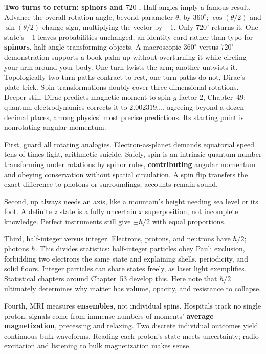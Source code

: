 \begin{challenge}
\textbf{Two turns to return: spinors and $720^\circ$.} Half-angles imply a famous result. Advance the overall rotation angle, beyond parameter $\theta$, by $360^\circ$; $\cos(\theta/2)$ and $\sin(\theta/2)$ change sign, multiplying the vector by $-1$. Only $720^\circ$ returns it. One state's $-1$ leaves probabilities unchanged, an identity card rather than typo for \textbf{spinors}, half-angle-transforming objects. A macroscopic $360^\circ$ versus $720^\circ$ demonstration supports a book palm-up without overturning it while circling your arm around your body. One turn twists the arm; another untwists it. Topologically two-turn paths contract to rest, one-turn paths do not, Dirac's plate trick. Spin transformations doubly cover three-dimensional rotations. Deeper still, Dirac predicts magnetic-moment-to-spin $g$ factor $2$, Chapter~49; quantum electrodynamics corrects it to $2.002319\ldots$, agreeing beyond a dozen decimal places, among physics' most precise predictions. Its starting point is nonrotating angular momentum.
\end{challenge}


First, guard all rotating analogies. Electron-as-planet demands equatorial speed tens of times light, arithmetic suicide. Safely, spin is an intrinsic quantum number transforming under rotations by spinor rules, \textbf{contributing} angular momentum and obeying conservation without spatial circulation. A spin flip transfers the exact difference to photons or surroundings; accounts remain sound.

Second, up always needs an axis, like a mountain's height needing sea level or its foot. A definite $z$ state is a fully uncertain $x$ superposition, not incomplete knowledge. Perfect instruments still give $\pm\hbar/2$ with equal proportions.

Third, half-integer versus integer. Electrons, protons, and neutrons have $\hbar/2$; photons $\hbar$. This divides statistics: half-integer particles obey Pauli exclusion, forbidding two electrons the same state and explaining shells, periodicity, and solid floors. Integer particles can share states freely, as laser light exemplifies. Statistical chapters around Chapter~53 develop this. Here note that $\hbar/2$ ultimately determines why matter has volume, opacity, and resistance to collapse.

Fourth, MRI measures \textbf{ensembles}, not individual spins. Hospitals track no single proton; signals come from immense numbers of moments' \textbf{average magnetization}, precessing and relaxing. Two discrete individual outcomes yield continuous bulk waveforms. Reading each proton's state meets uncertainty; radio excitation and listening to bulk magnetization makes sense.

